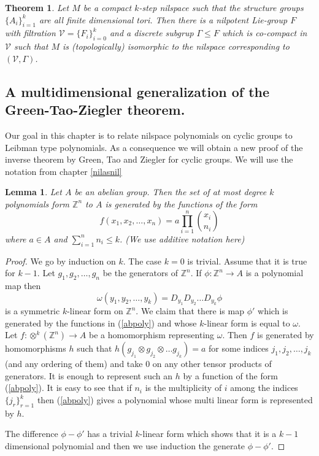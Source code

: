 \documentclass [11pt] {article}
\newtheorem{lemma}{Lemma}[section]
\newtheorem{theorem}{Theorem}
\begin{document}
\begin{theorem}\label{finitedimnil} Let $M$ be a compact $k$-step nilspace such that the structure groups $\{A_i\}_{i=1}^k$ are all finite dimensional tori. Then there is a nilpotent Lie-group $F$ with filtration $\mathcal{V}=\{F_i\}_{i=0}^k$ and a discrete subgrup $\Gamma\leq F$ which is co-compact in $\mathcal{V}$ such that $M$ is (topologically) isomorphic to the nilspace corresponding to $(\mathcal{V},\Gamma)$.
\end{theorem}



\subsection{A multidimensional generalization of the Green-Tao-Ziegler theorem.}\label{cyclic}

Our goal in this chapter is to relate nilspace polynomials on cyclic groups to Leibman type polynomials.
As a consequence we will obtain a new proof of the inverse theorem by Green, Tao and Ziegler for cyclic groups.
We will use the notation from chapter \ref{nilasnil}

\begin{lemma}\label{polyab} Let $A$ be an abelian group. Then the set of at most degree $k$ polynomials form $\mathbb{Z}^n$ to $A$ is generated by the functions of the form
\begin{equation}\label{abpoly}
f(x_1,x_2,\dots,x_n)=a\prod_{i=1}^n{{x_i}\choose{n_i}}
\end{equation}
where $a\in A$ and $\sum_{i=1}^n n_i\leq k$.
(We use additive notation here)
\end{lemma}

\begin{proof} We go by induction on $k$. The case $k=0$ is trivial. Assume that it is true for $k-1$. Let $g_1,g_2,\dots,g_n$ be the generators of $\mathbb{Z}^n$. If $\phi:\mathbb{Z}^n\rightarrow A$ is a polynomial map then $$\omega(y_1,y_2,\dots,y_k)=D_{y_1}D_{y_2}\dots D_{y_k}\phi$$ is a symmetric $k$-linear form on $\mathbb{Z}^n$. We claim that there is map $\phi'$ which is generated by the functions in (\ref{abpoly}) and whose $k$-linear form is equal to $\omega$. Let $f:\otimes^k(\mathbb{Z}^n)\rightarrow A$ be a homomorphism representing $\omega$. Then $f$ is generated by homomorphisms $h$ such that $h(g_{j_1}\otimes g_{j_2}\otimes\dots g_{j_k})=a$ for some indices $j_1,j_2,\dots,j_k$ (and any ordering of them) and take $0$ on any other tensor products of generators. It is enough to represent such an $h$ by a function of the form (\ref{abpoly}). 
It is easy to see that if $n_i$ is the multiplicity of $i$ among the indices $\{j_r\}_{r=1}^k$ then (\ref{abpoly}) gives a polynomial whose multi linear form is represented by $h$. 

The difference $\phi-\phi'$ has a trivial $k$-linear form which shows that it is a $k-1$ dimensional polynomial and then we use induction the generate $\phi-\phi'$.
\end{proof}
\end{document}
